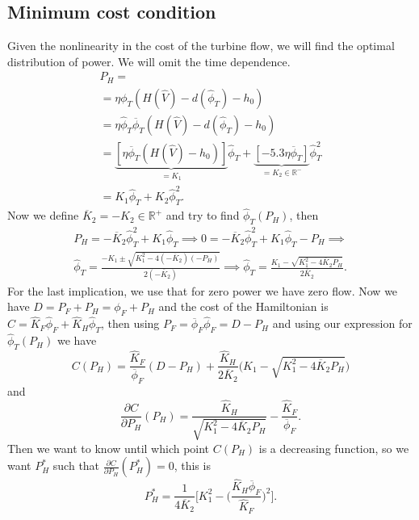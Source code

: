 \documentclass[12pt]{article}
\theoremstyle{definition}
\theoremstyle{remark}
\newcommand{\R}{\mathbb{R}}
\begin{document}
\subsection{Minimum cost condition}

Given the nonlinearity in the cost of the turbine flow, we will find the optimal distribution of power. We will omit the time dependence.
\begin{multline*}
P_H=\\
=\eta\phi_T(H(\hat{V})-d(\hat{\phi}_T)-h_0)\\
=\eta\hat{\phi}_T\overline{\phi}_T(H(\hat{V})-d(\hat{\phi}_T)-h_0)\\
=\underbrace{[\eta\overline{\phi}_T(H(\hat{V})-h_0)]}_{=K_1}\hat{\phi}_T+\underbrace{[-5.3\eta\overline{\phi}_T]}_{=K_2\in\R^-}\hat{\phi}_T^2\\
=K_1\hat{\phi}_T+K_2\hat{\phi}_T^2.
\end{multline*}
Now we define $\overline{K}_2=-K_2\in\R^+$ and try to find $\hat{\phi}_T(P_H)$, then
\begin{multline*}
P_H=-\overline{K}_2\hat{\phi}_T^2+K_1\hat{\phi}_T\implies0=-\overline{K}_2\hat{\phi}_T^2+K_1\hat{\phi}_T-P_H\implies\\
\hat{\phi}_T=\frac{-K_1\pm\sqrt{K_1^2-4(-\overline{K}_2)(-P_H)}}{2(-\overline{K}_2)}\implies
\hat{\phi}_T=\frac{K_1-\sqrt{K_1^2-4\overline{K}_2P_H}}{2\overline{K}_2}.
\end{multline*}
For the last implication, we use that for zero power we have zero flow. Now we have $D=P_F+P_H=\phi_F+P_H$ and the cost of the Hamiltonian is $C=\hat{K}_F\hat{\phi}_F+\hat{K}_H\hat{\phi}_T$, then using $P_F=\overline{\phi}_F\hat{\phi}_F=D-P_H$ and using our expression for $\hat{\phi}_T(P_H)$ we have
\begin{equation*}
C(P_H)=\frac{\hat{K}_F}{\overline{\phi}_F}(D-P_H)+\frac{\hat{K}_H}{2\overline{K}_2}\Bigg(K_1-\sqrt{K_1^2-4\overline{K}_2P_H}\Bigg)
\end{equation*}
and
\begin{equation*}
\frac{\partial C}{\partial P_H}(P_H)=\frac{\hat{K}_H}{\sqrt{K_1^2-4\overline{K}_2P_H}}-\frac{\hat{K}_F}{\overline{\phi}_F}.
\end{equation*}
Then we want to know until which point $C(P_H)$ is a decreasing function, so we want $P_H^*$ such that $\frac{\partial C}{\partial P_H}(P_H^*)=0$, this is
\begin{equation*}
P_H^*=\frac{1}{4\overline{K}_2}\Bigg[K_1^2-\Bigg(\frac{\hat{K}_H\overline{\phi}_F}{\hat{K}_F}\Bigg)^2\Bigg].
\end{equation*}
\end{document}
